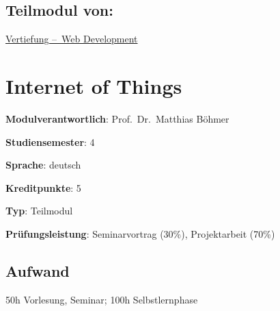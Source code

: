 \hypertarget{teilmodul-vonpathlabelmi-2017modulbeschreibungen-bachelorba_wd_frontend-development}{%
\section*{Teilmodul
von:\label{/mi-2017/modulbeschreibungen-bachelor/BA_WD_Frontend-Development}}\label{teilmodul-vonpathlabelmi-2017modulbeschreibungen-bachelorba_wd_frontend-development}}

\hyperref[/mi-2017/modulbeschreibungen-bachelor/BA_Vertiefung-Web_Development]{Vertiefung – Web Development}

\hypertarget{internet-of-thingspathlabelmi-2017modulbeschreibungen-bachelorba_wd_internet-of-things}{%
\chapter{Internet of
Things\label{/mi-2017/modulbeschreibungen-bachelor/BA_WD_Internet-of-things}}\label{internet-of-thingspathlabelmi-2017modulbeschreibungen-bachelorba_wd_internet-of-things}}

\begin{modulHead}
\textbf{Modulverantwortlich}: Prof.~Dr.~Matthias
Böhmer
\end{modulHead}
\begin{modulHead}
\textbf{Studiensemester}:
4
\end{modulHead}
\begin{modulHead}
\textbf{Sprache}:
deutsch
\end{modulHead}
\begin{modulHead}
\textbf{Kreditpunkte}:
5
\end{modulHead}
\begin{modulHead}
\textbf{Typ}:
Teilmodul
\end{modulHead}
\begin{modulHead}
\textbf{Prüfungsleistung}:
Seminarvortrag (30\%), Projektarbeit (70\%)
\end{modulHead}


\hypertarget{aufwandpathlabelmi-2017modulbeschreibungen-bachelorba_wd_internet-of-things}{%
\section*{Aufwand\label{/mi-2017/modulbeschreibungen-bachelor/BA_WD_Internet-of-things}}\label{aufwandpathlabelmi-2017modulbeschreibungen-bachelorba_wd_internet-of-things}}

50h Vorlesung, Seminar; 100h Selbstlernphase

